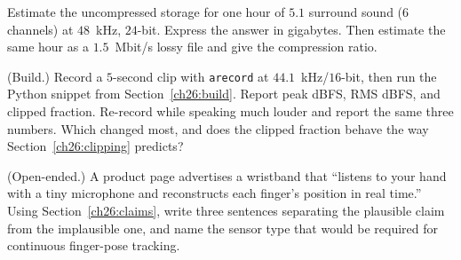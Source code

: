 \begin{exercise}
Estimate the uncompressed storage for one hour of $5.1$ surround sound ($6$ channels) at
$48$~kHz, $24$-bit. Express the answer in gigabytes. Then estimate the same hour as a
$1.5$~Mbit/s lossy file and give the compression ratio.
\end{exercise}

\begin{exercise}
(Build.) Record a $5$-second clip with \texttt{arecord} at $44.1$~kHz/$16$-bit, then run the
Python snippet from Section~\ref{ch26:build}. Report peak dBFS, RMS dBFS, and clipped fraction.
Re-record while speaking much louder and report the same three numbers. Which changed most, and
does the clipped fraction behave the way Section~\ref{ch26:clipping} predicts?
\end{exercise}

\begin{exercise}
(Open-ended.) A product page advertises a wristband that ``listens to your hand with a
tiny microphone and reconstructs each finger's position in real time.'' Using
Section~\ref{ch26:claims}, write three sentences separating the plausible claim from the
implausible one, and name the sensor type that would be required for continuous
finger-pose tracking.
\end{exercise}
